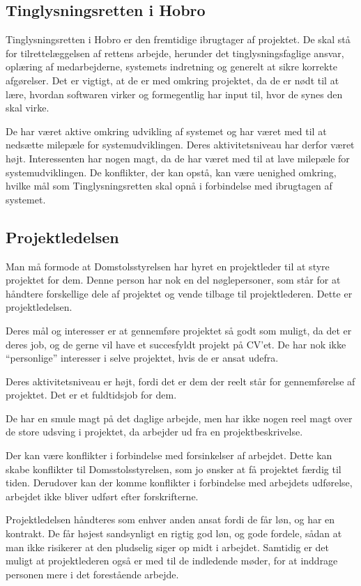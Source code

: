\documentclass[10pt,a4paper,danish]{article}
\begin{document}
\subsection{Tinglysningsretten i Hobro}
Tinglysningsretten i Hobro er den fremtidige ibrugtager af projektet. De skal stå for tilrettelæggelsen af rettens arbejde, herunder det tinglysningsfaglige ansvar, oplæring af medarbejderne, systemets indretning og generelt at sikre korrekte afgørelser.
Det er vigtigt, at de er med omkring projektet, da de er nødt til at lære, hvordan softwaren virker og formegentlig har input til, hvor de synes den skal virke.

De har været aktive omkring udvikling af systemet og har været med til at nedsætte milepæle for systemudviklingen. Deres aktivitetsniveau har derfor været højt.
Interessenten har nogen magt, da de har været med til at lave milepæle for systemudviklingen.
De konflikter, der kan opstå, kan være uenighed omkring, hvilke mål som Tinglysningsretten skal opnå i forbindelse med ibrugtagen af systemet.

\subsection{Projektledelsen}
Man må formode at Domstolsstyrelsen har hyret en projektleder til at styre projektet for dem. Denne person har nok en del nøglepersoner, som står for at håndtere forskellige dele af projektet og vende tilbage til projektlederen. Dette er projektledelsen.

Deres mål og interesser er at gennemføre projektet så godt som muligt, da det er deres job, og de gerne vil have et succesfyldt projekt på CV'et. De har nok ikke "`personlige"' interesser i selve projektet, hvis de er ansat udefra.

Deres aktivitetsniveau er højt, fordi det er dem der reelt står for gennemførelse af projektet. Det er et fuldtidsjob for dem.

De har en smule magt på det daglige arbejde, men har ikke nogen reel magt over de store udsving i projektet, da arbejder ud fra en projektbeskrivelse.

Der kan være konflikter i forbindelse med forsinkelser af arbejdet. Dette kan skabe konflikter til Domsstolsstyrelsen, som jo ønsker at få projektet færdig til tiden. Derudover kan der komme konflikter i forbindelse med arbejdets udførelse, arbejdet ikke bliver udført efter forskrifterne.

Projektledelsen håndteres som enhver anden ansat fordi de får løn, og har en kontrakt. De får højest sandsynligt en rigtig god løn, og gode fordele, sådan at man ikke risikerer at den pludselig siger op midt i arbejdet. Samtidig er det muligt at projektlederen også er med til de indledende møder, for at inddrage personen mere i det forestående arbejde.
\end{document}
